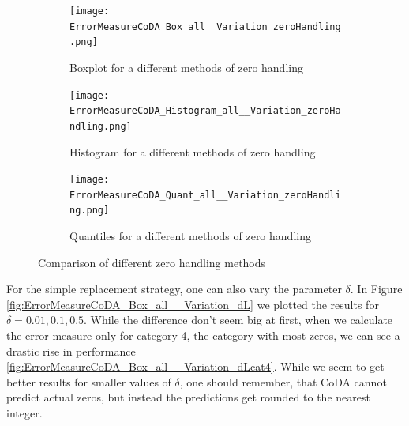 \begin{figure}[htb!]
\centering
\begin{subfigure}[b]{0.45\textwidth}
\texttt{[image: ErrorMeasureCoDA\_Box\_all\_\_Variation\_zeroHandling.png]}
\caption{Boxplot for a different methods of zero handling}
\label{fig:Coda zero handling Box}
\end{subfigure}
\hfill
\begin{subfigure}[b]{0.45\textwidth}
\texttt{[image: ErrorMeasureCoDA\_Histogram\_all\_\_Variation\_zeroHandling.png]}
\caption{Histogram for a different methods of zero handling}
\label{fig:Coda zero handling Hist}
\end{subfigure}
\hfill
\begin{subfigure}[b]{0.8\textwidth}
\texttt{[image: ErrorMeasureCoDA\_Quant\_all\_\_Variation\_zeroHandling.png]}
\caption{Quantiles for a different methods of zero handling}
\label{fig:Coda zero handling Quant}
\end{subfigure}
\caption{Comparison of different zero handling methods}
\label{fig:Coda zero handling Comp1}
\end{figure}

For the simple replacement strategy, one can also vary the parameter $\delta$. In Figure \ref{fig:ErrorMeasureCoDA_Box_all__Variation_dL} we plotted the results for $\delta=0.01,0.1,0.5$. While the difference don't seem big at first, when we calculate the error measure only for category 4, the category with most zeros, we can see a drastic rise in performance \ref{fig:ErrorMeasureCoDA_Box_all__Variation_dLcat4}. While we seem to get better results for smaller values of $\delta$, one should remember, that CoDA cannot predict actual zeros, but instead the predictions get rounded to the nearest integer. 



